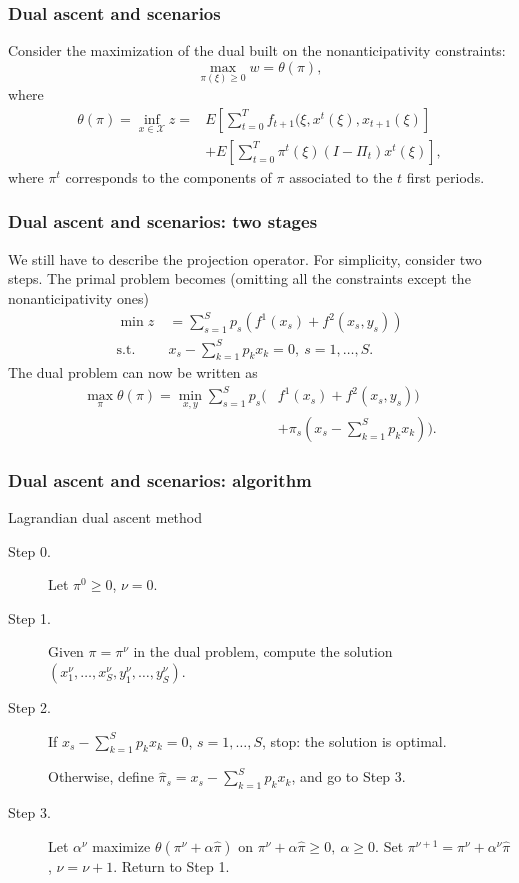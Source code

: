\documentclass[french]{beamer}
\begin{document}
\begin{frame}
\frametitle{Dual ascent and scenarios}

Consider the maximization of the dual built on the nonanticipativity constraints:
\[
\max_{\pi(\xi) \geq 0} w = \theta(\pi),
\]
where
\begin{align*}
\theta(\pi) = \inf_{x \in \mathcal{X}} z = & 
E\left[\sum_{t = 0}^T f_{t+1} (\xi, x^t(\xi), x_{t+1}(\xi) \right] \\
& + E\left[\sum_{t = 0}^T \pi^t(\xi)(I-\Pi_t)x^t(\xi) \right],
\end{align*}
where $\pi^t$ corresponds to the components of $\pi$ associated to the $t$ first periods.

\end{frame}

\begin{frame}
\frametitle{Dual ascent and scenarios: two stages}

We still have to describe the projection operator.
For simplicity, consider two steps.
The primal problem becomes (omitting all the constraints except the nonanticipativity ones)
\begin{align*}
\min z\ & = \sum_{s = 1}^S p_s \left( f^1(x_s)+f^2(x_s, y_s) \right) \\
\mbox{s.t. } & x_s - \sum_{k=1}^S p_k x_k = 0,\ s=1,\ldots,S. 
\end{align*}
The dual problem can now be written as
\begin{align*}
\max_{\pi} \theta(\pi) = \min_{x,y} \sum_{s=1}^S p_s\Biggl(& f^1(x_s)+f^2(x_s,
y_s))\\
& + \pi_s\left( x_s - \sum_{k=1}^S p_kx_k \right) \Biggr).
\end{align*}

\end{frame}

\begin{frame}
\frametitle{Dual ascent and scenarios: algorithm}

\begin{algo}{Lagrandian dual ascent method}
\begin{description}
\item[Step 0.] Let $\pi^0 \geq 0$, $\nu = 0$.
\item[Step 1.]
Given $\pi = \pi^{\nu}$ in the dual problem, compute the solution
$(x^{\nu}_1, \ldots, x^{\nu}_S, y_1^{\nu},\ldots{},y_S^{\nu})$.
\item[Step 2.]
If $x_s - \sum_{k = 1}^S p_kx_k = 0$, $s = 1,\ldots,S$, stop: the solution is optimal.

Otherwise, define $\hat{\pi}_s = x_s - \sum_{k=1}^S p_kx_k$, and go to Step 3.
\item[Step 3.]
Let $\alpha^\nu$ maximize $\theta(\pi^{\nu}+\alpha\hat{\pi})$ on
$\pi^{\nu}+\alpha\hat{\pi} \geq 0,\ \alpha \geq 0$.
Set $\pi^{\nu+1} = \pi^{\nu} + \alpha^{\nu}\hat{\pi}$, $\nu = \nu+1$. Return to Step 1.
\end{description}
\end{algo}

\end{frame}
\end{document}
